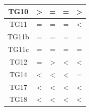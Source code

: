 \documentclass[fleqn,10pt]{SelfArx} %
\begin{document}
\begin{table}[]
\begin{tabular}{c|c|c|c|c|}
\multicolumn{1}{|c|}{TG10}           & \cellcolor[HTML]{F4C7C3}\textgreater{} & =                                      & =                                      & \cellcolor[HTML]{F4C7C3}\textgreater{} \\ \hline
\multicolumn{1}{|c|}{TG11}           & =                                      & =                                      & =                                      & \cellcolor[HTML]{B7E1CD}\textless{}    \\ \hline
\multicolumn{1}{|c|}{TG11b}          & =                                      & =                                      & =                                      & =                                      \\ \hline
\multicolumn{1}{|c|}{TG11c}          & =                                      & =                                      & =                                      & =                                      \\ \hline
\multicolumn{1}{|c|}{TG12}           & =                                      & \cellcolor[HTML]{F4C7C3}\textgreater{} & \cellcolor[HTML]{B7E1CD}\textless{}    & \cellcolor[HTML]{B7E1CD}\textless{}    \\ \hline
\multicolumn{1}{|c|}{TG14}           & \cellcolor[HTML]{B7E1CD}\textless{}    & \cellcolor[HTML]{B7E1CD}\textless{}    & \cellcolor[HTML]{B7E1CD}\textless{}    & =                                      \\ \hline
\multicolumn{1}{|c|}{TG17}           & \cellcolor[HTML]{B7E1CD}\textless{}    & \cellcolor[HTML]{B7E1CD}\textless{}    & \cellcolor[HTML]{B7E1CD}\textless{}    & \cellcolor[HTML]{B7E1CD}\textless{}    \\ \hline
\multicolumn{1}{|c|}{TG18}           & \cellcolor[HTML]{B7E1CD}\textless{}    & \cellcolor[HTML]{B7E1CD}\textless{}    & \cellcolor[HTML]{B7E1CD}\textless{}    & \cellcolor[HTML]{B7E1CD}\textless{}    \\ \hline
\end{tabular}
\end{table}



\end{document}
